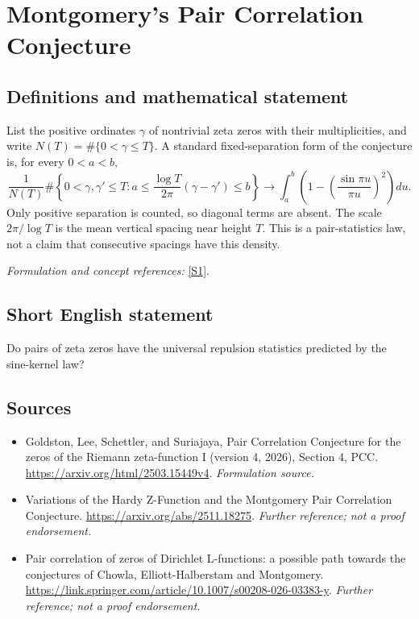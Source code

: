 \documentclass[11pt]{article}
\begin{document}
\section*{\texorpdfstring{Montgomery's Pair Correlation Conjecture}{Montgomery's Pair Correlation Conjecture}}\label{1277}
\subsection{Definitions and mathematical statement}
List the positive ordinates $\gamma$ of nontrivial zeta zeros with their multiplicities, and write $N(T)=\#\{0<\gamma\le T\}$. A standard fixed-separation form of the conjecture is, for every $0<a<b$,
\[
 \frac{1}{N(T)}\#\left\{0<\gamma,\gamma'\le T:
 a\le\frac{\log T}{2\pi}(\gamma-\gamma')\le b\right\}
 \longrightarrow\int_a^b\left(1-\left(\frac{\sin\pi u}{\pi u}\right)^2\right)du.
\]
Only positive separation is counted, so diagonal terms are absent. The scale $2\pi/\log T$ is the mean vertical spacing near height $T$. This is a pair-statistics law, not a claim that consecutive spacings have this density.
\par\smallskip\textit{Formulation and concept references:} \href{https://arxiv.org/html/2503.15449v4}{[S1]}.

\subsection{Short English statement}
Do pairs of zeta zeros have the universal repulsion statistics predicted by the sine-kernel law?
\subsection{Sources}
\begin{itemize}
\item[S1]Goldston, Lee, Schettler, and Suriajaya, Pair Correlation Conjecture for the zeros of the Riemann zeta-function I (version 4, 2026), Section 4, PCC.
\url{https://arxiv.org/html/2503.15449v4}.
\textit{Formulation source.}
\item[S2]Variations of the Hardy Z-Function and the Montgomery Pair Correlation Conjecture.
\url{https://arxiv.org/abs/2511.18275}.
\textit{Further reference; not a proof endorsement.}
\item[S3]Pair correlation of zeros of Dirichlet L-functions: a possible path towards the conjectures of Chowla, Elliott-Halberstam and Montgomery.
\url{https://link.springer.com/article/10.1007/s00208-026-03383-y}.
\textit{Further reference; not a proof endorsement.}
\end{itemize}
\end{document}
